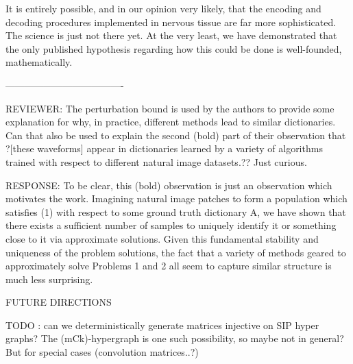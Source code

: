 It is entirely possible, and in our opinion very likely, that the encoding and decoding procedures implemented in nervous tissue are far more sophisticated. The science is just not there yet. At the very least, we have demonstrated that the only published hypothesis regarding how this could be done is well-founded, mathematically.

-------------------------------------

REVIEWER:
The perturbation bound is used by the authors to provide some explanation for why, in practice, different methods lead to similar dictionaries. Can that also be used to explain the second (bold) part of their observation that ?[these waveforms] appear in dictionaries learned by a variety of algorithms trained with respect to different natural image datasets.?? Just curious.

RESPONSE:
To be clear, this (bold) observation is just an observation which motivates the work. Imagining natural image patches to form a population which satisfies (1) with respect to some ground truth dictionary A, we have shown that there exists a sufficient number of samples to uniquely identify it or something close to it via approximate solutions. Given this fundamental stability and uniqueness of the problem solutions, the fact that a variety of methods geared to approximately solve Problems 1 and 2 all seem to capture similar structure is much less surprising. 



FUTURE DIRECTIONS


TODO : can we deterministically generate matrices injective on SIP hyper graphs? The (mCk)-hypergraph is one such possibility, so maybe not in general? But for special cases (convolution matrices..?)

